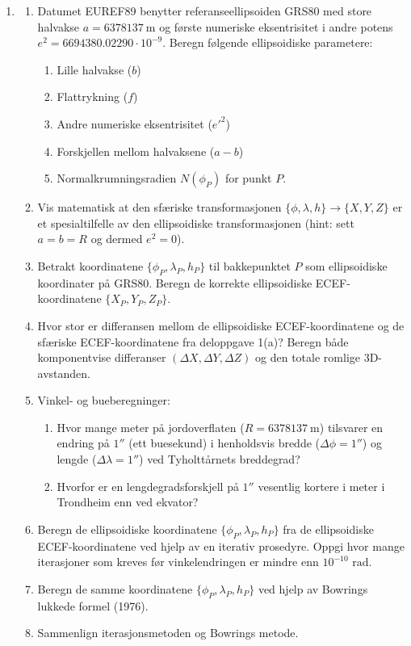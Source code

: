 \documentclass[a4paper, norsk, 11pt, twoside]{article}
\begin{document}
\begin{enumerate}
\newpage

\textit{Ellipsoidiske koordinater}
\item
  \begin{enumerate}
  \item Datumet EUREF89 benytter referanseellipsoiden GRS80 med store halvakse $a=\SI{6378137}{\meter}$ og første numeriske eksentrisitet i andre potens $e^{2}=6694380.02290 \cdot 10^{-9}$. Beregn følgende ellipsoidiske parametere:
  \begin{enumerate}
    \item Lille halvakse ($b$)
    \item Flattrykning ($f$)
    \item Andre numeriske eksentrisitet ($e'^{2}$)
    \item Forskjellen mellom halvaksene ($a-b$)
    \item Normalkrumningsradien $N(\phi_P)$ for punkt $P$.
  \end{enumerate}
  \item Vis matematisk at den sfæriske transformasjonen $\{\phi,\lambda,h\} \rightarrow \{X,Y,Z\}$ er et spesialtilfelle av den ellipsoidiske transformasjonen (hint: sett $a=b=R$ og dermed $e^2=0$).
  \item Betrakt koordinatene $\{\phi_{P},\lambda_{P},h_{P}\}$ til bakkepunktet $P$ som ellipsoidiske koordinater på GRS80. Beregn de korrekte ellipsoidiske ECEF-koordinatene $\{X_{P},Y_{P},Z_{P}\}$.
  \item Hvor stor er differansen mellom de ellipsoidiske ECEF-koordinatene og de sfæriske ECEF-koordinatene fra deloppgave 1(a)? Beregn både komponentvise differanser $(\Delta X, \Delta Y, \Delta Z)$ og den totale romlige 3D-avstanden.
  \item Vinkel- og bueberegninger:
  \begin{enumerate}
    \item Hvor mange meter på jordoverflaten ($R = \SI{6378137}{\meter}$) tilsvarer en endring på $1''$ (ett buesekund) i henholdsvis bredde ($\Delta\phi = 1''$) og lengde ($\Delta\lambda = 1''$) ved Tyholttårnets breddegrad?
    \item Hvorfor er en lengdegradsforskjell på $1''$ vesentlig kortere i meter i Trondheim enn ved ekvator?
  \end{enumerate}
  \item Beregn de ellipsoidiske koordinatene $\{\phi_{P},\lambda_{P},h_{P}\}$ fra de ellipsoidiske ECEF-koordinatene ved hjelp av en iterativ prosedyre. Oppgi hvor mange iterasjoner som kreves før vinkelendringen er mindre enn $10^{-10}\text{ rad}$.
  \item Beregn de samme koordinatene $\{\phi_{P},\lambda_{P},h_{P}\}$ ved hjelp av Bowrings lukkede formel (1976).
  \item Sammenlign iterasjonsmetoden og Bowrings metode.
  \end{enumerate}
\end{enumerate}
\end{document}
